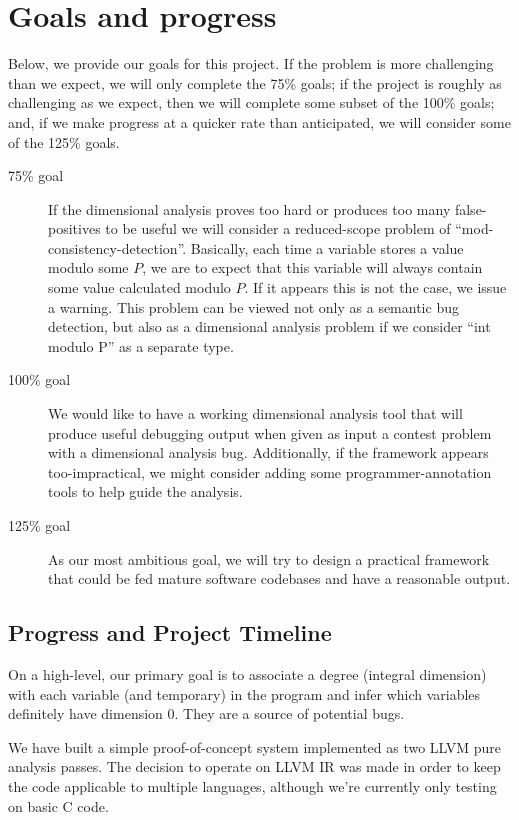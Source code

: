 \documentclass[12pt]{article}
\begin{document}
\section{Goals and progress}

Below, we provide our goals for this project. If the problem is more challenging than we expect, we will only complete the 75\% goals; if the project is roughly as challenging as we expect, then we will complete some subset of the 100\% goals; and, if we make progress at a quicker rate than anticipated, we will consider some of the 125\% goals.
\begin{description}
\item [75\% goal] If the dimensional analysis proves too hard or produces too many false-positives to be useful we will consider a reduced-scope problem of ``mod-consistency-detection''. Basically, each time a variable stores a value modulo some $P$, we are to expect that this variable will always contain some value calculated modulo $P$. If it appears this is not the case, we issue a warning. This problem can be viewed not only as a semantic bug detection, but also as a dimensional analysis problem if we consider ``int modulo P'' as a separate type.

\item [100\% goal] We would like to have a working dimensional analysis tool that will produce useful debugging output when given as input a contest problem with a dimensional analysis bug. Additionally, if the framework appears too-impractical, we might consider adding some programmer-annotation tools to help guide the analysis. 

\item [125\% goal] As our most ambitious goal, we will try to design a practical framework that could be fed mature software codebases and have a reasonable output.
\end{description}

\subsection{Progress and Project Timeline}

On a high-level, our primary goal is to associate a degree (integral dimension) with each variable (and temporary) in the program and infer which variables definitely have dimension 0. They are a source of potential bugs.

We have built a simple proof-of-concept system implemented as two LLVM pure analysis passes.
The decision to operate on LLVM IR was made in order to keep the code applicable to multiple languages, although we're currently only testing on basic C code.
\end{document}
